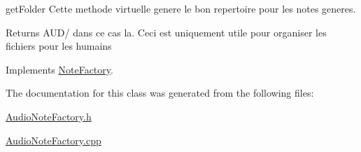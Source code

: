 get\-Folder Cette methode virtuelle genere le bon repertoire pour les notes generes. 

\begin{DoxyReturn}{Returns}
A\-U\-D/ dans ce cas la. Ceci est uniquement utile pour organiser les fichiers pour les humains 
\end{DoxyReturn}


Implements \hyperlink{class_note_factory_a9d4c924038af855a7c4a51455b13ab83}{Note\-Factory}.



The documentation for this class was generated from the following files\-:\begin{DoxyCompactItemize}
\item 
\hyperlink{_audio_note_factory_8h}{Audio\-Note\-Factory.\-h}\item 
\hyperlink{_audio_note_factory_8cpp}{Audio\-Note\-Factory.\-cpp}\end{DoxyCompactItemize}
